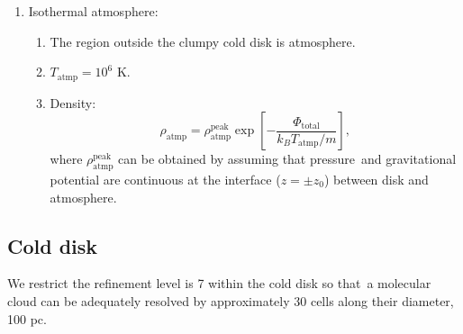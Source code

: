 \documentclass[twocolumn]{aastex631}
\begin{document}
\begin{enumerate}
\begin{enumerate}
    \item Pressure: $\displaystyle p_{\text{disk}}=\rho_{\text{disk}}T_{\text{disk}}$.

    \item The clumpy cuboid, using the publicly\
          available pyFC code\footnote{\url{https://pypi.python.org/pypi/pyFC}},\
          are described by a log-normal distribution with mean 1.0 and variance 5.0.\
          Also, the power spectrum of the clumpy cuboid is characterized by $k_{\text{min}}$ and $\beta$,\
          where $k_{\text{min}}$ sets the maximum cloud size within the clumpy cuboid,\
          and $\beta$ is the slope of power spectrum in Fourier space.
          In this paper, we set $\beta=-5/3$ and $k_{\text{min}}=375$ to follow the Kolmogorov spectrum\
          and to limits the maximum size of an individual cloud to approximately 25 pc.

    \item The clumpy disk is then constructed by multiplying a fractal cuboid with \Cref{disk-density}.

    \item The clouds and voids within clumpy disk are pressure balanced.
  \end{enumerate}


\item Isothermal atmosphere:
  \begin{enumerate}
     \item The region outside the clumpy cold disk is atmosphere.
     \item $T_{\text{atmp}}=10^{6}$ K. \citep{temperature-MW}
     \item Density:
          \begin{equation}
             \rho_{\text{atmp}}=\rho_{\text{atmp}}^{\text{peak}}
             \exp\left[-\frac{\Phi_{\text{total}}}{k_{B}T_{\text{atmp}}/m}\right],
             \label{atmosphere-density}
          \end{equation}
          where $\rho_{\text{atmp}}^{\text{peak}}$ can be obtained by assuming that pressure\
          and gravitational potential are continuous at the interface ($z=\pm z_{0}$) between disk and atmosphere.
  \end{enumerate}



\end{enumerate}

\subsection{Cold disk}
  We restrict the refinement level is 7 within the cold disk so that\
  a molecular cloud can be adequately resolved by approximately 30 cells along their diameter, 100 pc.\
\end{document}
